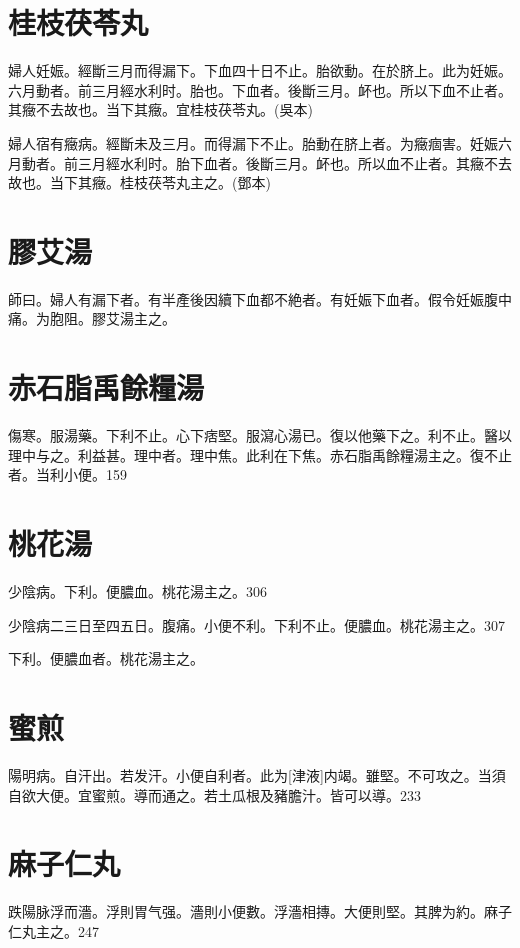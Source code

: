 \documentclass[12pt,twoside,UTF8,b5paper]{ctexbook}
\begin{document}
\section{桂枝茯苓丸}

婦人妊娠。經斷三月而得漏下。下血四十日不止。胎欲動。在於脐上。此为妊娠。六月動者。前三月經水利时。胎也。下血者。後斷三月。衃也。所以下血不止者。其癥不去故也。当下其癥。宜桂枝茯苓丸。(吳本)

婦人宿有癥病。經斷未及三月。而得漏下不止。胎動在脐上者。为癥痼害。妊娠六月動者。前三月經水利时。胎下血者。後斷三月。衃也。所以血不止者。其癥不去故也。当下其癥。桂枝茯苓丸主之。(鄧本)

\section{膠艾湯}

師曰。婦人有漏下者。有半產後因續下血都不絶者。有妊娠下血者。假令妊娠腹中痛。为胞阻。膠艾湯主之。

\section{赤石脂禹餘糧湯}

傷寒。服湯藥。下利不止。心下痞堅。服瀉心湯已。復以他藥下之。利不止。醫以理中与之。利益甚。理中者。理中焦。此利在下焦。赤石脂禹餘糧湯主之。復不止者。当利小便。159

\section{桃花湯}

少陰病。下利。便膿血。桃花湯主之。306

少陰病二三日至四五日。腹痛。小便不利。下利不止。便膿血。桃花湯主之。307

下利。便膿血者。桃花湯主之。

\section{蜜煎}

陽明病。自汗出。若发汗。小便自利者。此为[津液]内竭。雖堅。不可攻之。当須自欲大便。宜蜜煎。導而通之。若土瓜根及豬膽汁。皆可以導。233

\section{麻子仁丸}

跌陽脉浮而濇。浮則胃气强。濇則小便數。浮濇相摶。大便則堅。其脾为約。麻子仁丸主之。247
\end{document}
